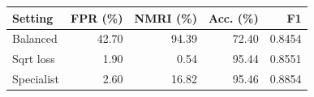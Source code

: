 \begin{tabular}{lrrrr}
\toprule
Setting & FPR (\%) & NMRI (\%) & Acc. (\%) & F1 \\
\midrule
Balanced & 42.70 & 94.39 & 72.40 & 0.8454 \\
Sqrt loss & 1.90 & 0.54 & 95.44 & 0.8551 \\
Specialist & 2.60 & 16.82 & 95.46 & 0.8854 \\
\bottomrule
\end{tabular}
